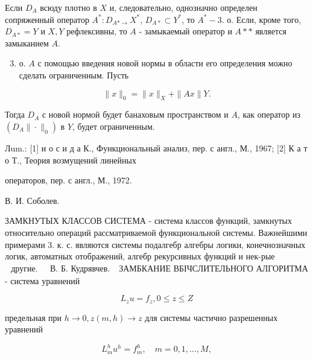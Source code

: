 \documentclass[10pt]{article}
\begin{document}
Если $D_{A}$ всюду плотно в $X$ и, следовательно, однозначно определен сопряженный оператор $A^{*}: D_{A * \rightarrow} X^{*}$, $D_{A *} \subset Y^{*}$, то $A^{*}-3$. о. Если, кроме того, $D_{A *}=Y$ и $X, Y$ рефлексивны, то $A$ - замыкаемый оператор и $A * *$ является замыканием $A$.



\begin{enumerate}

  \setcounter{enumi}{2}

  \item о. $A$ с помощью введения новой нормы в области его определения можно сделать ограниченным. Пусть

\end{enumerate}



\[

\|x\|_{0}=\|x\|_{X}+\|A x\| Y .

\]



Тогда $D_{A}$ с новой нормой будет банаховым пространством и $A$, как оператор из $\left(D_{A}\|\cdot\|_{0}\right)$ в $Y$, будет ограниченным.



Лum.: [1] и о с и д а К., Функциональный анализ, пер. с англ., М., 1967; [2] К а т о Т., Теория возмущений линейных

операторов, пер. с англ., М., 1972.

В. И. Соболев.



ЗАМКНУТЫХ КЛАССОВ СИСТЕМА - система классов функций, замкнутых относительно операций рассматриваемой функциональной системы. Важнейшими примерами 3. к. с. являются системы подалгебр алгебры логики, конечнозначных логик, автоматных отображений, алгебр рекурсивных функций и нек-рые $\begin{array}{ll}\text { другие. } & \text { В. Б. Кудрявчев. }\end{array}$ ЗАМБКАНИЕ ВБІЧСЛИТЕЛЬНОГО АЛГОРИТМА - система уравнений



\[

L_{z} u=f_{z}, 0 \leqslant z \leqslant Z

\]



предельная при $h \rightarrow 0, z(m, h) \rightarrow z$ для системы частично разрешенных уравнений



\[

L_{m}^{h} u^{h}=f_{m}^{h}, \quad m=0,1, \ldots, M,

\]
\end{document}
